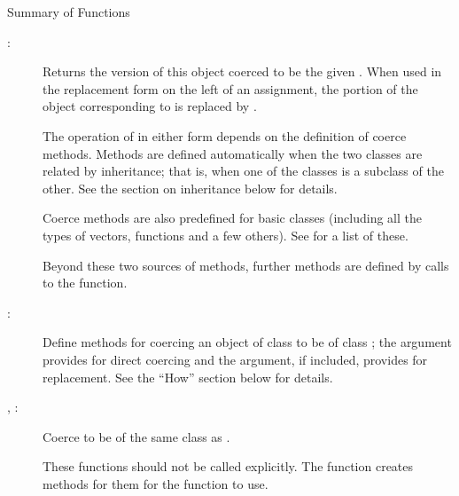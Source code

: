%
\begin{Section}{Summary of Functions}
\begin{description}

\item[:] 
Returns the version of this object coerced to be the given
.  When used in the replacement form on the left of
an assignment, the portion of the object corresponding to
 is replaced by .

The operation of  in either form depends on the
definition of coerce methods.  Methods are defined automatically
when the two classes are related by inheritance; that is, when
one of the classes is a subclass of the other.  See the section
on inheritance  below for details.

Coerce methods are also predefined for basic classes (including all
the types of vectors, functions and a few others). See
 for a list of these.

Beyond these two sources of methods, further methods are defined
by calls to the  function.



\item[:] 
Define methods for coercing an object of class  to be of class ; the  argument provides for direct coercing and the  argument, if included, provides for replacement.  See the ``How'' section below for details.


\item[, :] 
Coerce  to be of the same class as .

These functions should not be called explicitly.  The function
 creates methods for them for the
 function to use.



\end{description}

\end{Section}
%
